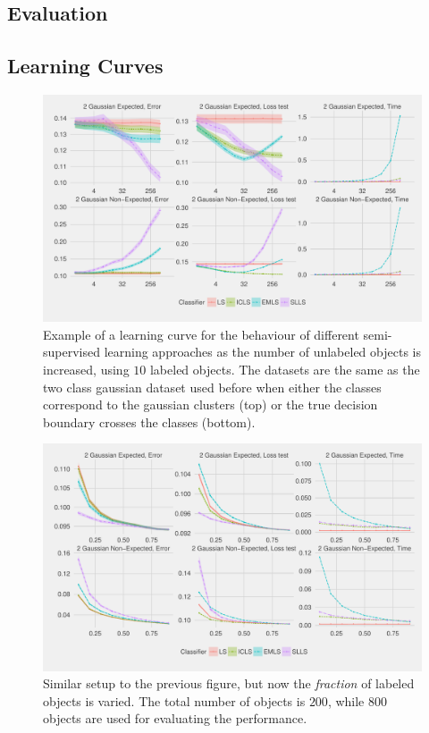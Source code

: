 \documentclass[final]{beamer}
\begin{document}
\begin{frame}[t]
\begin{multicols}{3}
\vfill
\columnbreak

\section{Evaluation}
\subsection{Learning Curves}
\begin{figure}
\centering
\includegraphics[width=0.98\columnwidth]{Figure5.pdf}
\caption{Example of a learning curve for the behaviour of different semi-supervised learning approaches as the number of unlabeled objects is increased, using $10$ labeled objects. The datasets are the same as the two class gaussian dataset used before when either the classes correspond to the gaussian clusters (top) or the true decision boundary crosses the classes (bottom).}
\end{figure}

\begin{figure}
\centering
\includegraphics[width=0.98\columnwidth]{Figure6.pdf}
\caption{Similar setup to the previous figure, but now the \emph{fraction} of labeled objects is varied. The total number of objects is $200$, while $800$ objects are used for evaluating the performance.}
\end{figure}



\end{multicols}
\end{frame}
\end{document}
